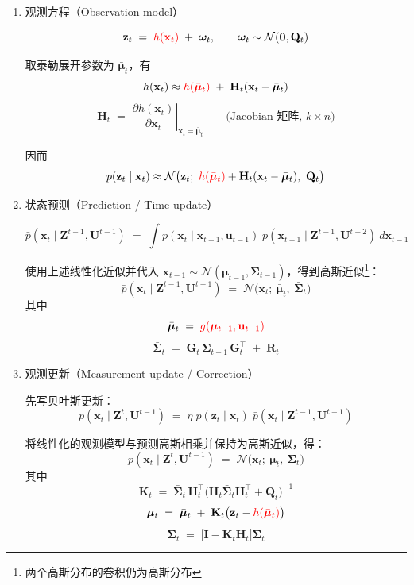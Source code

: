 \documentclass[../main.tex]{subfiles}
\begin{document}
\begin{enumerate}
{{\begin{enumerate}
    \item 观测方程（Observation model）
    
    $$
    \mathbf{z}_t \;=\; \textcolor{red}{h(\mathbf{x}_t)} \;+\; \boldsymbol{\omega}_t,\qquad \boldsymbol{\omega}_t\sim\mathcal{N}(\mathbf{0},\mathbf{Q}_t)
    $$
    
    取泰勒展开参数为 $\bar{\boldsymbol{\mu}}_t$，有
    $$
    h(\mathbf{x}_t) \approx \textcolor{red}{h(\bar{\boldsymbol{\mu}}_t)} \;+\; \mathbf{H}_t(\mathbf{x}_t - \bar{\boldsymbol{\mu}}_t)
    $$
    $$
    \mathbf{H}_t \;=\; \left.\frac{\partial h(\mathbf{x}_t)}{\partial \mathbf{x}_t}\right|_{\mathbf{x}_t=\bar{\boldsymbol{\mu}}_t}
    \qquad\text{(Jacobian 矩阵, } k\times n\text{)}
    $$
    
    因而
    $$
    p(\mathbf{z}_t\mid \mathbf{x}_t)\approx \mathcal{N}\big(\mathbf{z}_t;\ \textcolor{red}{h(\bar{\boldsymbol{\mu}}_t)} + \mathbf{H}_t(\mathbf{x}_t-\bar{\boldsymbol{\mu}}_t),\ \mathbf{Q}_t\big)
    $$
    
    \item 状态预测（Prediction / Time update）
    
    $$
    \bar{p}(\mathbf{x}_t\mid \mathbf{Z}^{t-1},\mathbf{U}^{t-1})
    \;=\;\int p(\mathbf{x}_t\mid \mathbf{x}_{t-1},\mathbf{u}_{t-1})\; p(\mathbf{x}_{t-1}\mid \mathbf{Z}^{t-1},\mathbf{U}^{t-2})\ d\mathbf{x}_{t-1}
    $$
    
    使用上述线性化近似并代入 $\mathbf{x}_{t-1}\sim\mathcal{N}(\boldsymbol{\mu}_{t-1},\boldsymbol{\Sigma}_{t-1})$，得到高斯近似\footnote{两个高斯分布的卷积仍为高斯分布}：
    $$
    \bar{p}(\mathbf{x}_t\mid \mathbf{Z}^{t-1},\mathbf{U}^{t-1}) \;=\; \mathcal{N}\big(\mathbf{x}_t;\ \bar{\boldsymbol{\mu}}_t,\ \bar{\boldsymbol{\Sigma}}_t\big)
    $$
    其中
    $$
    \bar{\boldsymbol{\mu}}_t \;=\; \textcolor{red}{g(\boldsymbol{\mu}_{t-1},\mathbf{u}_{t-1})}
    $$
    $$
    \bar{\boldsymbol{\Sigma}}_t \;=\; \mathbf{G}_t\,\boldsymbol{\Sigma}_{t-1}\,\mathbf{G}_t^\top \;+\; \mathbf{R}_t
    $$
    
    \item 观测更新（Measurement update / Correction）
    
    先写贝叶斯更新：
    $$
    p(\mathbf{x}_t\mid \mathbf{Z}^t,\mathbf{U}^{t-1}) \;=\; \eta\; p(\mathbf{z}_t\mid \mathbf{x}_t)\; \bar{p}(\mathbf{x}_t\mid \mathbf{Z}^{t-1},\mathbf{U}^{t-1})
    $$
    
    将线性化的观测模型与预测高斯相乘并保持为高斯近似，得：
    $$
    p(\mathbf{x}_t\mid \mathbf{Z}^t,\mathbf{U}^{t-1}) \;=\; \mathcal{N}\big(\mathbf{x}_t;\ \boldsymbol{\mu}_t,\ \boldsymbol{\Sigma}_t\big)
    $$
    其中
    $$
    \mathbf{K}_t \;=\; \bar{\boldsymbol{\Sigma}}_t \,\mathbf{H}_t^\top \big(\mathbf{H}_t \bar{\boldsymbol{\Sigma}}_t \mathbf{H}_t^\top + \mathbf{Q}_t\big)^{-1}
    $$
    $$
    \boldsymbol{\mu}_t \;=\; \bar{\boldsymbol{\mu}}_t \;+\; \mathbf{K}_t\big(\mathbf{z}_t - \textcolor{red}{h(\bar{\boldsymbol{\mu}}_t)}\big)
    $$
    $$
    \boldsymbol{\Sigma}_t \;=\; \big[\mathbf{I} - \mathbf{K}_t \mathbf{H}_t\big] \bar{\boldsymbol{\Sigma}}_t
    $$
    

\end{enumerate}}}
\end{enumerate}
\end{document}
